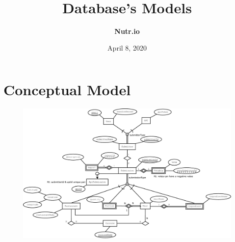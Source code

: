 \documentclass{article}
\title{\textbf{Database's Models}}
\date{April 8, 2020}
\author{\textbf{Nutr.io}}
\begin{document}
\maketitle

\section{Conceptual Model}

\begin{figure}[H]
    \includegraphics[scale=0.28]{Nutr.io_Database_Diagram.eps}
    \centering 
\end{figure}
\newpage
\end{document}
